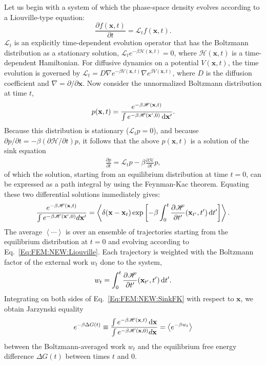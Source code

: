 Let us begin with a system of which the phase-space density evolves according to a Liouville-type equation:
\begin{equation}
	\frac{\partial f(\mathbf{x},t)}{\partial t}=\mathscr{L}_tf(\mathbf{x},t).
	\label{Eq:FEM:NEW:Liouville}
\end{equation}
$\mathscr{L}_t$ is an explicitly time-dependent evolution operator that has the Boltzmann distribution as a stationary solution, $\mathscr{L}_t e^{-\beta \mathscr{H}(\mathbf{x},t)}=0$, where $\mathscr{H}(\mathbf{x},t)$ is a time-dependent Hamiltonian. For diffusive dynamics on a potential $V(\mathbf{x},t)$, the time evolution is governed by $\mathscr{L}_t=D\nabla e^{-\beta V(\mathbf{x},t)}\nabla e^{\beta V(\mathbf{x},t)}$, where $D$ is the diffusion coefficient and $\nabla=\partial/\partial \mathbf{x}$. Now consider the unnormalized Boltzmann distribution at time $t$,
\begin{align}
	p(\mathbf{x},t)=\frac{e^{-\beta \mathscr{H}(\mathbf{x},t)}}{\int e^{-\beta \mathscr{H}(\mathbf{x}^\prime,0)} \mathop{}\!\mathrm{d}\mathbf{x}^\prime}.
\end{align}
Because this distribution is stationary ($\mathscr{L}_tp=0$), and because $\partial p/\partial t=-\beta(\partial \mathscr{H}/\partial t)p$, it follows that the above $p(\mathbf{x},t)$ is a solution of the sink equation
\begin{align}
	\frac{\partial p}{\partial t}=\mathscr{L}_tp-\beta\frac{\partial \mathscr{H}}{\partial t}p,
\end{align}
of which the solution, starting from an equilibrium distribution at time $t=0$, can be expressed as a path integral by using the Feynman-Kac theorem. Equating these two differential solutions immediately gives:
\begin{equation}
	\frac{e^{-\beta\mathscr{H}(\mathbf{x},t)}}{\int e^{-\beta \mathscr{H}(\mathbf{x}^\prime,0)} d\mathbf{x}^\prime}=\left\langle \delta(\mathbf{x}-\mathbf{x}_t)\exp{\left[-\beta\int_0^t\frac{\partial \mathscr{H}}{\partial t^\prime}(\mathbf{x}_{t^{\prime}},t^{\prime})\mathop{}\!\mathrm{d}t^\prime\right]}\right\rangle.
	\label{Eq:FEM:NEW:SinkFK}
\end{equation}
The average $\left\langle \cdots \right\rangle$ is over an ensemble of trajectories starting from the equilibrium distribution at $t=0$ and evolving according to Eq.~\ref{Eq:FEM:NEW:Liouville}. Each trajectory is weighted with the Boltzmann factor of the external work $w_t$ done to the system,
\begin{equation}
	w_t=\int_0^t\frac{\partial \mathscr{H}}{\partial t^\prime}(\mathbf{x}_{t^{\prime}},t^{\prime})\mathop{}\!\mathrm{d} t^\prime.
\end{equation}
Integrating on both sides of Eq.~\ref{Eq:FEM:NEW:SinkFK} with respect to $\mathbf{x}$, we obtain Jarzynski equality
\begin{equation}
	e^{-\beta \Delta G(t)}\equiv \frac{\int e^{-\beta\mathscr{H}(\mathbf{x},t)}\mathop{}\!\mathrm{d} \mathbf{x}}{\int e^{-\beta \mathscr{H}(\mathbf{x},0)} d\mathbf{x}}=\left \langle e^{-\beta w_t}\right\rangle
\end{equation}
between the Boltzmann-averaged work $w_t$ and the equilibrium free energy difference $\Delta G(t)$ between times $t$ and $0$.

